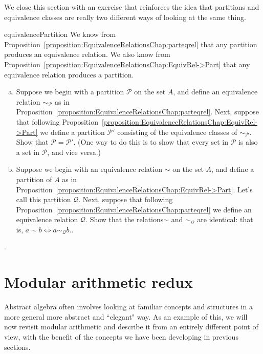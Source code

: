 We close this section with  an exercise that reinforces the idea that partitions and equivalence classes are really two different ways of looking at the same thing.

\begin{exercise}{equivalencePartition}
We know from Proposition~\ref{proposition:EquivalenceRelationsChap:parteqrel} that any partition  produces an equivalence relation.  
We also know from Proposition~\ref{proposition:EquivalenceRelationsChap:EquivRel->Part} that any equivalence relation produces a partition.
\begin{enumerate}[(a)]
\item
Suppose we begin with a partition $\mathcal{P}$ on the set $A$, and define an equivalence relation $\sim_{\mathcal{P}}$ as in Proposition~\ref{proposition:EquivalenceRelationsChap:parteqrel}. Next, suppose that following Proposition~\ref{proposition:EquivalenceRelationsChap:EquivRel->Part} we define a partition   $\mathcal{P}'$  consisting of the equivalence classes of $\sim_{\mathcal{P}}$. Show that $\mathcal{P}=\mathcal{P}'$. (One way to do this is to show that every set in $\mathcal{P}$ is also a set in $\mathcal{P}$, and vice versa.)
\item
Suppose we begin with an equivalence relation $\sim$ on the set $A$, and define a partition of $A$ as in Proposition~\ref{proposition:EquivalenceRelationsChap:EquivRel->Part}. Let's call this partition $\mathcal{Q}$.  Next, suppose that following Proposition~\ref{proposition:EquivalenceRelationsChap:parteqrel} we define an equivalence relation  $\mathcal{Q}$. Show that the relations$\sim$ and $\sim_{\mathcal{Q}}$ are identical:  that is, $a \sim b \iff a \sim_{\mathcal{Q}} b$..
\end{enumerate}
\end{exercise}. 


\section{Modular arithmetic redux\quad
{}} \label{sec:EquivalenceRelations:ModularArithmetic}

Abstract algebra often involves looking at familiar concepts and structures in a more general more abstract and ``elegant" way. As an example of this, we will now revisit modular arithmetic and describe it from an entirely different point of view, with the benefit of the concepts we have been developing in previous sections.

